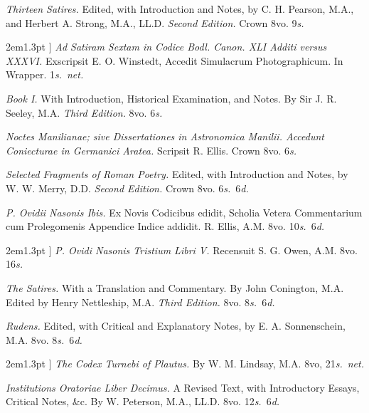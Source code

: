 \documentclass[12pt,oneside]{book}[2021/10/04]
\newcommand{\longdash}{\rule[.5ex]{2em}{1.3pt}
}
\newenvironment{advlist}{
  \begin{description}[leftmargin=1em, parsep=0.2ex, listparindent=1em,]
}{\end{description}}
\newcommand{\¬}{\hphantom{0}}
\begin{document}
\begin{advlist}
\item[Juvenal.] \textit{Thirteen Satires.}
Edited, with Introduction and
Notes, by C. H. Pearson, M.A., and
Herbert A. Strong, M.A., LL.D.
\textit{Second Edition.} Crown 8vo. 9\textit{s.}

\item[\longdash] \textit{Ad Satiram Sextam
in Codice Bodl. Canon. XLI Additi
versus XXXVI.} Exscripsit E. O.
Winstedt, Accedit Simulacrum
Photographicum. In Wrapper.
1\textit{s.}\ \textit{net.}

\item[Livy.] \textit{Book I.} With Introduction,
Historical Examination,
and Notes. By Sir J. R. Seeley,
M.A. \textit{Third Edition.} 8vo. 6\textit{s.}

\item[Manilius.] \textit{Noctes Manilianae;
sive Dissertationes in Astronomica Manilii.
Accedunt Coniecturae in Germanici
Aratea.} Scripsit R. Ellis.
Crown 8vo. 6\textit{s.}

\item[Merry.] \textit{Selected Fragments
of Roman Poetry.} Edited, with Introduction
and Notes, by W. W.
Merry, D.D. \textit{Second Edition.} Crown
8vo. 6\textit{s.}\ 6\textit{d.}

\item[Ovid.] \textit{P. Ovidii Nasonis Ibis.}
Ex Novis Codicibus edidit, Scholia
Vetera Commentarium cum Prolegomenis
Appendice Indice addidit.
R. Ellis, A.M. 8vo. 10\textit{s.}\ 6\textit{d.}

\item[\longdash] \textit{P. Ovidi Nasonis Tristium
Libri V.} Recensuit S. G. Owen,
A.M. 8vo. 16\textit{s.}

\item[Persius.] \textit{The Satires.} With
a Translation and Commentary.
By John Conington, M.A. Edited
by Henry Nettleship, M.A. \textit{Third
Edition.} 8vo. 8\textit{s.}\ 6\textit{d.}

\item[Plautus.] \textit{Rudens.} Edited,
with Critical and Explanatory
Notes, by E. A. Sonnenschein,
M.A. 8vo. 8\textit{s.}\ 6\textit{d.}

\item[\longdash] \textit{The Codex Turnebi of
Plautus.} By W. M. Lindsay, M.A.
8vo, 21\textit{s.}\ \textit{net.}

\item[Quintilian.] \textit{Institutions
Oratoriae Liber Decimus.} A Revised
Text, with Introductory Essays,
Critical Notes, \&c. By W. Peterson,
M.A., LL.D. 8vo. 12\textit{s.}\ 6\textit{d.}


\end{advlist}
\end{document}
